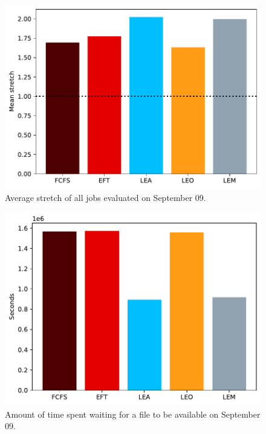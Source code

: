 \documentclass[conference,10pt]{IEEEtran}
\begin{document}
\begin{figure}[tb]\centering\includegraphics[scale=0.41]{../MBSS/plot/Results_FCFS_Score_Backfill_2022-09-09->2022-09-09_V10000_Mean_Stretch_450_128_32_256_4_1024.pdf}\caption{Average stretch of all jobs evaluated on September 09.}
\label{stretch.09-09}\end{figure}
\begin{figure}[tb]\centering\includegraphics[scale=0.41]{../MBSS/plot/Results_FCFS_Score_Backfill_2022-09-09->2022-09-09_V10000_Total_waiting_for_a_load_time_and_transfer_time_450_128_32_256_4_1024.pdf}\caption{Amount of time spent waiting for a file to be available on September 09.}
\label{load.09-09}\end{figure}
\end{document}
